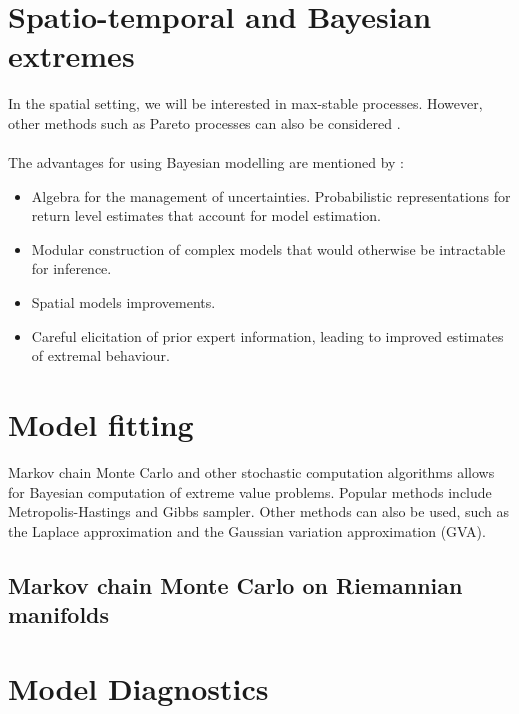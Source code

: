 \documentclass[12pt]{article}
\theoremstyle{definition}
\theoremstyle{remark}
\theoremstyle{definition}
\theoremstyle{plain}
\begin{document}
\section{Spatio-temporal and Bayesian extremes}
In the spatial setting, we will be interested in max-stable processes. However, other methods such as Pareto processes can also be considered \cite{Ferreira2014} 
\cite{Thibaud2015EfficientProcesses}. \\ \\
The advantages for using Bayesian modelling are mentioned by \cite{Coles2005}:
\begin{itemize}
    \item Algebra for the management of uncertainties. Probabilistic representations for return level estimates that account for model estimation.
    \item Modular construction of complex models that would otherwise be intractable for inference.
    \item Spatial models improvements.
    \item Careful elicitation of prior expert information, leading to improved estimates of extremal behaviour.
\end{itemize}


\section{Model fitting}
Markov chain Monte Carlo and other stochastic computation algorithms allows for Bayesian computation of extreme value problems. Popular methods include Metropolis-Hastings and Gibbs sampler. Other methods can also be used, such as the Laplace approximation and the Gaussian variation approximation (GVA).
\subsection{Markov chain Monte Carlo on Riemannian manifolds}

\section{Model Diagnostics}
\end{document}
